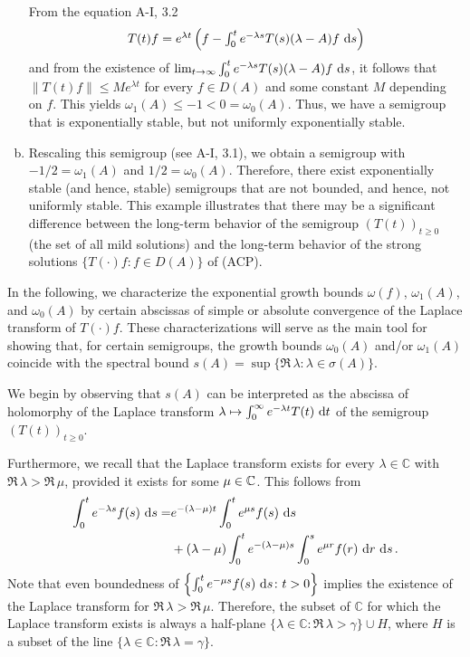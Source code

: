 \begin{example}
\begin{enumerate}[(a), wide, labelsep=1em]
From the equation A-I, 3.2
\[\textstyle{
T(t)f = e^{\lambda t}\left(f - \int_{0}^{t} e^{-\lambda s} T(s) (\lambda - A)f \,\mathop{}\!\mathrm{d}{s}\right)
}\]
and from the existence of $\lim_{t \to \infty} \int_{0}^{t} e^{-\lambda s} T(s) (\lambda - A)f \,\mathop{}\!\mathrm{d}{s}$, it follows that 
$\|T(t)f\| \leq Me^{\lambda t}$ for every $f \in D(A)$ and some constant $M$ depending on $f$. This yields $\omega_{1}(A) \le -1 < 0 = \omega_0(A)$. 
Thus, we have a semigroup that is exponentially stable, but not uniformly exponentially stable.

\item
Rescaling this semigroup (see A-I, 3.1), we obtain a semigroup with $-1/2 = \omega_{1}(A)$ and $1/2 = \omega_0(A)$.
Therefore, there exist exponentially stable (and hence, stable) semigroups that are not bounded, and hence, not uniformly stable.
This example illustrates that there may be a significant difference between the long-term behavior of the semigroup $(T(t))_{t \geq 0}$ (\ie the set of all mild solutions) and the long-term behavior of the strong solutions $\{T(\cdot)f \colon f \in D(A)\}$ of (ACP). 
\end{enumerate}
\end{example}

In the following, we characterize the exponential growth bounds $\omega(f)$, $\omega_{1}(A)$, and $\omega_0(A)$ by certain abscissas of simple or absolute convergence of the Laplace transform of $T(\cdot)f$. 
These characterizations will serve as the main tool for 
showing that, for certain semigroups, the growth bounds $\omega_0(A)$ and/or $\omega_{1}(A)$ coincide with the spectral bound $s(A) = \sup\{\Re\,\lambda\colon\lambda \in \sigma(A)\}$.

We begin by observing that $s(A)$ can be interpreted as the abscissa of holomorphy of the Laplace transform $\lambda \mapsto \int_{0}^{\infty} e^{-\lambda t} T(t) \,\mathop{}\!\mathrm{d}{t}$ of the semigroup $(T(t))_{t \geq 0}$.

Furthermore, we recall that the Laplace transform exists for every $\lambda \in \mathbb{C}$ with $\Re\,\lambda > \Re\,\mu$, provided it exists for some $\mu\in\mathbb{C}$.
This follows from 
\begin{align}\label{eq:a4-1.1}
\int_0^t e^{-\lambda s} f(s)\,\mathop{}\!\mathrm{d}{s} = &e^{-(\lambda-\mu)t} \int_{0}^{t} e^{\mu s} f(s) \,\mathop{}\!\mathrm{d}{s} \\ &+ (\lambda - \mu) \int_{0}^{t} e^{-(\lambda-\mu)s} \int_{0}^{s} e^{\mu r} f(r) \,\mathop{}\!\mathrm{d}{r}\,\mathop{}\!\mathrm{d}{s} \,. \notag
\end{align}
Note that even boundedness of $\left\{ \int_{0}^{t} e^{-\mu s}f(s) \,\mathop{}\!\mathrm{d}{s} \colon t > 0\right\}$ implies the existence of the Laplace transform for $\Re\,\lambda > \Re\,\mu$. 
Therefore, the subset of $\mathbb{C}$ for which the Laplace transform exists is always a half-plane 
$\{\lambda \in \mathbb{C}\colon\Re\,\lambda > \gamma\} \cup H$, where $H$ is a subset of the line $\{\lambda \in \mathbb{C}\colon\Re\,\lambda = \gamma\}$.

